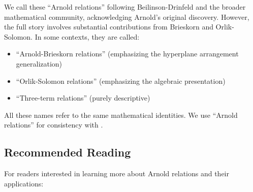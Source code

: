 \begin{remark}
We call these ``Arnold relations'' following Beilinson-Drinfeld \cite{BD04} and the broader 
mathematical community, acknowledging Arnold's original discovery. However, the full story 
involves substantial contributions from Brieskorn and Orlik-Solomon. In some contexts, 
they are called:
\begin{itemize}
\item ``Arnold-Brieskorn relations'' (emphasizing the hyperplane arrangement generalization)
\item ``Orlik-Solomon relations'' (emphasizing the algebraic presentation)
\item ``Three-term relations'' (purely descriptive)
\end{itemize}

All these names refer to the same mathematical identities. We use ``Arnold relations'' 
for consistency with \cite{BD04, CG17, GLZ22}.
\end{remark}

\subsection{Recommended Reading}

For readers interested in learning more about Arnold relations and their applications:


